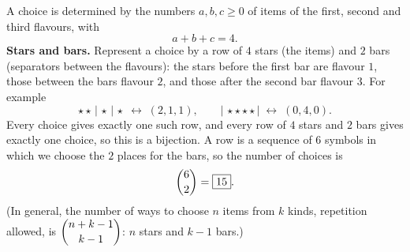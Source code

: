 A choice is determined by the numbers $a,b,c\ge0$ of items of the first, second and third flavours, with
\[
a+b+c=4 .
\]
\textbf{Stars and bars.} Represent a choice by a row of $4$ stars (the items) and $2$ bars (separators between the flavours): the stars before the first bar are flavour $1$, those between the bars flavour $2$, and those after the second bar flavour $3$. For example
\[
\star\star\,|\,\star\,|\,\star \;\leftrightarrow\; (2,1,1),\qquad |\,\star\star\star\star\,| \;\leftrightarrow\; (0,4,0).
\]
Every choice gives exactly one such row, and every row of $4$ stars and $2$ bars gives exactly one choice, so this is a bijection. A row is a sequence of $6$ symbols in which we choose the $2$ places for the bars, so the number of choices is
\[
\dbinom{6}{2}=\boxed{15}.
\]
(In general, the number of ways to choose $n$ items from $k$ kinds, repetition allowed, is $\dbinom{n+k-1}{k-1}$: $n$ stars and $k-1$ bars.)
